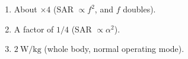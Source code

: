 \begin{enumerate}[leftmargin=1.6em,itemsep=2pt]
\item About $\times4$ (SAR $\propto f^2$, and $f$ doubles).
\item A factor of $1/4$ (SAR $\propto \alpha^2$).
\item $2\ \text{W/kg}$ (whole body, normal operating mode).
\end{enumerate}
